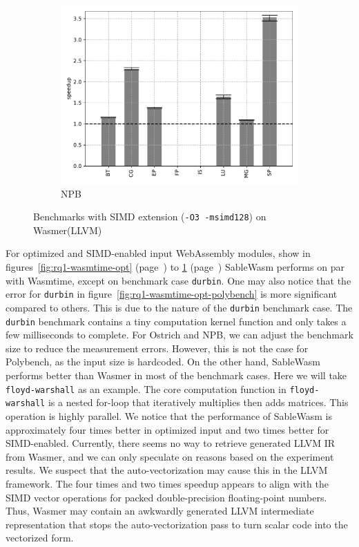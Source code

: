 \begin{figure}
\begin{subfigure}[t]{.45\textwidth}
        \includegraphics[width=\textwidth]
        {Images/6.1.RQ1/npb-wasmer-llvm-simd.pdf}
        \caption{NPB}
    \end{subfigure}
    \caption{Benchmarks with SIMD extension (\texttt{-O3 -msimd128}) on Wasmer(LLVM)}
    \label{fig:rq1-wasmer-llvm-simd}
\end{figure}

For optimized and SIMD-enabled input WebAssembly modules,
show in figures~\ref{fig:rq1-wasmtime-opt} (page~\pageref{fig:rq1-wasmtime-opt})
to \ref{fig:rq1-wasmer-llvm-simd} (page~\pageref{fig:rq1-wasmer-llvm-simd})
SableWasm performs on par with Wasmtime, except on benchmark case
\texttt{durbin}. One may also notice that the error for \texttt{durbin} in
figure~\ref{fig:rq1-wasmtime-opt-polybench} is more significant compared to
others. This is due to the nature of the \texttt{durbin} benchmark case.
The \texttt{durbin} benchmark contains a tiny computation kernel function and
only takes a few milliseconds to complete. For Ostrich and NPB, we can adjust
the benchmark size to reduce the measurement errors. However, this is not the
case for Polybench, as the input size is hardcoded. On the other hand,
SableWasm performs better than Wasmer in most of the benchmark cases. Here we
will take \texttt{floyd-warshall} as an example. The core computation
function in \texttt{floyd-warshall} is a nested for-loop that iteratively
multiplies then adds matrices. This operation is highly parallel. We notice
that the performance of SableWasm is approximately four times better in
optimized input and two times better for SIMD-enabled. Currently, there
seems no way to retrieve generated LLVM IR from Wasmer, and we can only
speculate on reasons based on the experiment results. We suspect that the
auto-vectorization may cause this in the LLVM framework. The four times and two
times speedup appears to align with the SIMD vector operations for packed
double-precision floating-point numbers. Thus, Wasmer may contain an awkwardly
generated LLVM intermediate representation that stops the auto-vectorization
pass to turn scalar code into the vectorized form.


